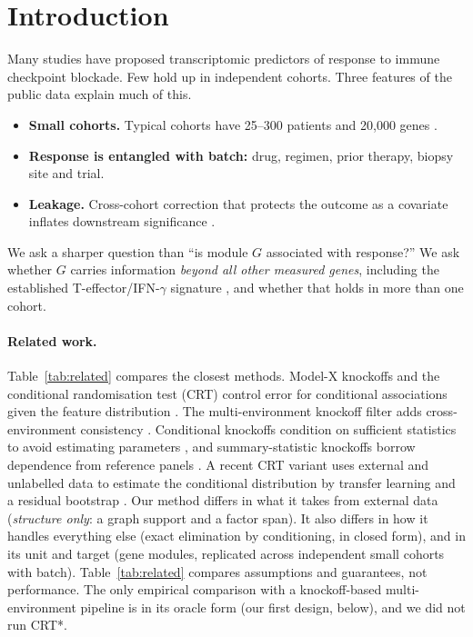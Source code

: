 \documentclass[10pt,twocolumn,letterpaper]{article}
\theoremstyle{remark}
\begin{document}
\section{Introduction}

Many studies have proposed transcriptomic predictors of response to immune checkpoint blockade. Few hold up in independent cohorts. Three features of the public data explain much of this.
\begin{itemize}
  \item \textbf{Small cohorts.} Typical cohorts have 25--300 patients and 20{,}000 genes \citep{hugo2016,riaz2017,gide2019,liu2019,jung2019,mariathasan2018,mcdermott2018,braun2020}.
  \item \textbf{Response is entangled with batch:} drug, regimen, prior therapy, biopsy site and trial.
  \item \textbf{Leakage.} Cross-cohort correction that protects the outcome as a covariate inflates downstream significance \citep{nygaard2016batch}.
\end{itemize}

We ask a sharper question than ``is module $G$ associated with response?'' We ask whether $G$ carries information \emph{beyond all other measured genes}, including the established T-effector/IFN-$\gamma$ signature \citep{ayers2017ifng}, and whether that holds in more than one cohort.

\paragraph{Related work.} Table~\ref{tab:related} compares the closest methods. Model-X knockoffs and the conditional randomisation test (CRT) control error for conditional associations given the feature distribution \citep{candes2018panning}. The multi-environment knockoff filter adds cross-environment consistency \citep{li2022multienv}. Conditional knockoffs condition on sufficient statistics to avoid estimating parameters \citep{huang2020relaxing}, and summary-statistic knockoffs borrow dependence from reference panels \citep{he2022ghostknockoff}. A recent CRT variant uses external and unlabelled data to estimate the conditional distribution by transfer learning and a residual bootstrap \citep{crtstar2026}. Our method differs in what it takes from external data (\emph{structure only}: a graph support and a factor span). It also differs in how it handles everything else (exact elimination by conditioning, in closed form), and in its unit and target (gene modules, replicated across independent small cohorts with batch). Table~\ref{tab:related} compares assumptions and guarantees, not performance. The only empirical comparison with a knockoff-based multi-environment pipeline is in its oracle form (our first design, below), and we did not run CRT*.
\end{document}

